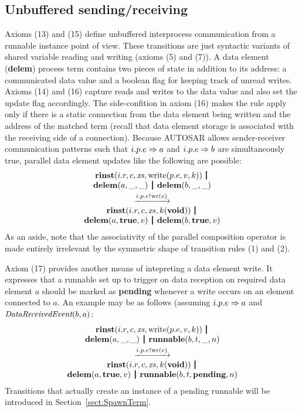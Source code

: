 \documentclass[twocolumn]{article}
\begin{document}
\subsection{Unbuffered sending/receiving}

Axioms (13) and (15) define unbuffered interprocess communication from a runnable instance point of view. These transitions are just syntactic variants of shared variable reading and writing (axioms (5) and (7)). A data element ({\bf delem}) process term contains two pieces of state in addition to its address: a communicated data value and a boolean flag for keeping track of unread writes. Axioms (14) and (16) capture reads and writes to the data value and also set the update flag accordingly. The side-confition in axiom (16) makes the rule apply only if there is a static connection from the data element being written and the address of the matched term (recall that data element storage is associated with the receiving side of a connection). Because AUTOSAR allows sender-receiver communication patterns such that $i.p.e \Rightarrow a$ and $i.p.e \Rightarrow b$ are simultaneously true, parallel data element updates like the following are possible:
$$
\begin{array}{c}
	\Trinst {i.r} c \Xs {\TrteWrite {p.e} v k} \,\Opar  \\
	{\Tdelem a \_ \_} \Opar {\Tdelem b \_ \_} \vspace{0.6ex} \\
	\red{\say{i.p.e}{\Twr v}} \\
	\Trinst {i.r} c \Xs {\Tap k \Tvoid} \,\Opar \\
	{\Tdelem a \Ttrue v} \Opar {\Tdelem b \Ttrue v}
\end{array}
$$
As an aside, note that the associativity of the parallel composition operator is made entirely irrelevant by the symmetric shape of transition rules (1) and (2).

Axiom (17) provides another means of intepreting a data element write. It expresses that a runnable set up to trigger on data reception on required data element $a$ should be marked as {\bf pending} whenever a write occurs on an element connected to $a$. An example may be as follows (assuming $i.p.e \Rightarrow a$ and $\emph{DataReceivedEvent}(b,a)$:
$$
\begin{array}{c}
	\Trinst {i.r} c \Xs {\TrteWrite {p.e} v k} \,\Opar  \\
	{\Tdelem a \_ \_} \Opar {\Trunnable b t \_ n} \vspace{0.6ex} \\
	\red{\say{i.p.e}{\Twr v}} \\
	\Trinst {i.r} c \Xs {\Tap k \Tvoid} \,\Opar \\
	{\Tdelem a \Ttrue v} \Opar {\Trunnable b t \Tpending n}
\end{array}
$$
Transitions that actually create an instance of a pending runnable will be introduced in Section~\ref{sect:SpawnTerm}.
\end{document}
